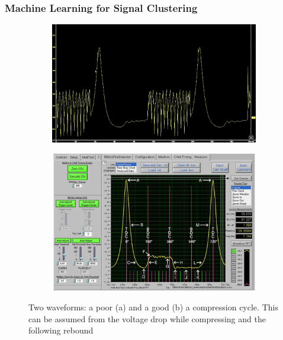 \subsubsection{Machine Learning for Signal Clustering}
\begin{figure}[ht]
  \centering
  
  \begin{subfigure}[b]{0.9\linewidth}
    \includegraphics[width=\linewidth]{figures/bad_enhanced.png}
    \caption{}
  \end{subfigure}
  \vspace{0.5em}
  \begin{subfigure}[b]{0.9\linewidth}
    \includegraphics[width=\linewidth]{figures/good.jpeg}
    \caption{}
  \end{subfigure}

  \caption{Two waveforms: a poor (a) and a good (b) a compression cycle. This can be assumed from the voltage drop while compressing and the following rebound}
  \label{fig:waveforms_good_bad}
\end{figure}
